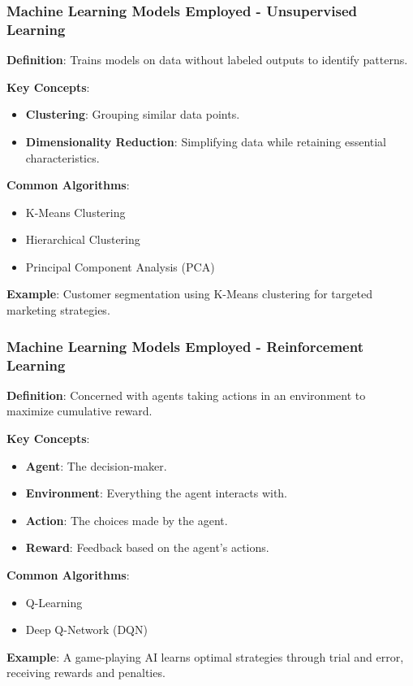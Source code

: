 \documentclass[aspectratio=169]{beamer}
\begin{document}
\begin{frame}[fragile]
    \frametitle{Machine Learning Models Employed - Unsupervised Learning}
    \textbf{Definition}: Trains models on data without labeled outputs to identify patterns.

    \textbf{Key Concepts}:
    \begin{itemize}
        \item \textbf{Clustering}: Grouping similar data points.
        \item \textbf{Dimensionality Reduction}: Simplifying data while retaining essential characteristics.
    \end{itemize}

    \textbf{Common Algorithms}:
    \begin{itemize}
        \item K-Means Clustering
        \item Hierarchical Clustering
        \item Principal Component Analysis (PCA)
    \end{itemize}
    
    \textbf{Example}:
    Customer segmentation using K-Means clustering for targeted marketing strategies.
\end{frame}

\begin{frame}[fragile]
    \frametitle{Machine Learning Models Employed - Reinforcement Learning}
    \textbf{Definition}: Concerned with agents taking actions in an environment to maximize cumulative reward.

    \textbf{Key Concepts}:
    \begin{itemize}
        \item \textbf{Agent}: The decision-maker.
        \item \textbf{Environment}: Everything the agent interacts with.
        \item \textbf{Action}: The choices made by the agent.
        \item \textbf{Reward}: Feedback based on the agent's actions.
    \end{itemize}

    \textbf{Common Algorithms}:
    \begin{itemize}
        \item Q-Learning
        \item Deep Q-Network (DQN)
    \end{itemize}
    
    \textbf{Example}:
    A game-playing AI learns optimal strategies through trial and error, receiving rewards and penalties.
\end{frame}
\end{document}
